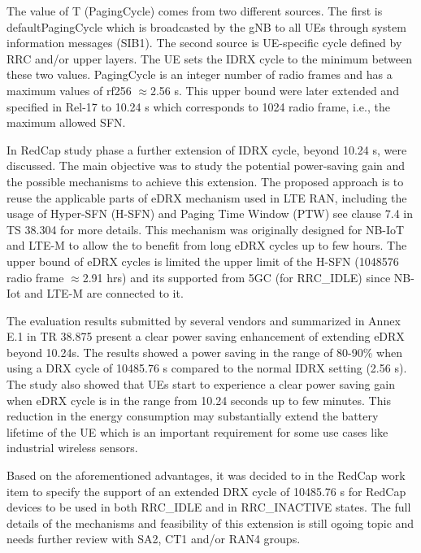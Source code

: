 \documentclass[conference]{IEEEtran}
\begin{document}


The value of T (PagingCycle) comes from two different sources. The first is defaultPagingCycle which is broadcasted by the gNB to all UEs through system information messages (SIB1). The second source is UE-specific cycle defined by RRC and/or upper layers. The UE sets the IDRX cycle to the minimum between these two values. PagingCycle is an integer number of radio frames and has a maximum values of rf256 $\approx$2.56 s. This upper bound were later extended and specified in Rel-17 to 10.24 s which corresponds to 1024 radio frame, i.e., the maximum allowed SFN.

In RedCap study phase a further extension of IDRX cycle, beyond 10.24 s, were discussed. The main objective was to study the potential power-saving gain and the possible mechanisms to achieve this extension. The proposed approach is to reuse the applicable parts of eDRX mechanism used in LTE RAN, including the usage of Hyper-SFN (H-SFN) and Paging Time Window (PTW) see clause 7.4 in TS 38.304 for more details. This mechanism was originally designed for NB-IoT and LTE-M to allow the to benefit from long eDRX cycles up to few hours. The upper bound of eDRX cycles is limited the upper limit of the H-SFN (1048576 radio frame $\approx$2.91 hrs) and its supported from 5GC (for RRC\_IDLE) since NB-Iot and LTE-M are connected to it.

The evaluation results submitted by several vendors and summarized in Annex E.1 in TR 38.875 \cite{3gpp.38.875} present a clear power saving enhancement of extending eDRX beyond 10.24s. The results showed a power saving in the range of 80-90$\%$ when using a DRX cycle of 10485.76 s compared to the normal IDRX setting (2.56 s). The study also showed that UEs start to experience a clear power saving gain when eDRX cycle is in the range from 10.24 seconds up to few minutes. This reduction in the energy consumption  may substantially extend the battery lifetime of the UE which is an important requirement for some use cases like industrial wireless sensors.
 
 Based on the aforementioned advantages, it was decided to in the RedCap work item to specify the support of an extended DRX cycle of 10485.76 s for RedCap devices to be used in both RRC\_IDLE and in RRC\_INACTIVE states. The full details of the mechanisms and feasibility of this extension is still ogoing topic and needs further review with SA2, CT1 and/or RAN4 groups.
\end{document}
